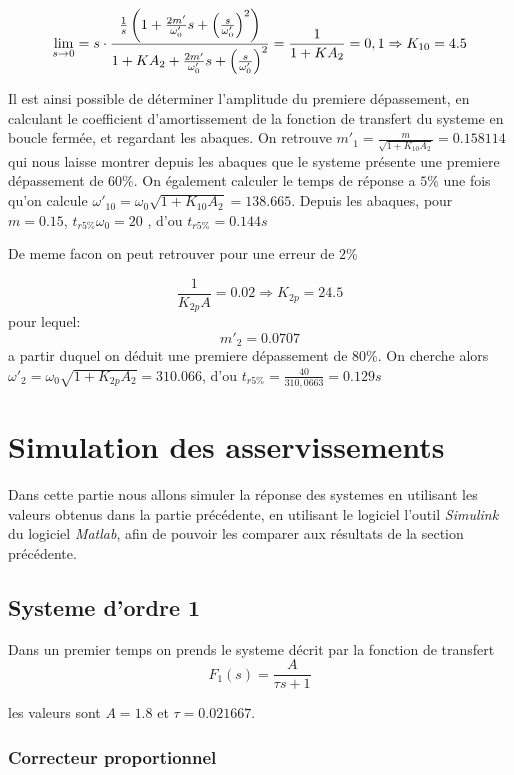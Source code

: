 \documentclass[12pt, a4paper]{report}
\begin{document}
$$
    \lim_{s \rightarrow 0} = s \cdot \frac{\frac{1}{s}\left(1 + \frac{2m'}{\omega_0'}s + \left( \frac{s}{\omega_0'}\right)^2\right)}{1 + KA_2 + \frac{2m'}{\omega_0'}s + \left( \frac{s}{\omega_0'}\right)^2} = \frac{1}{1 + KA_2} = 0,1 \Rightarrow K_{10} = 4.5 \\
$$

Il est ainsi possible de déterminer l'amplitude du premiere dépassement, en calculant le coefficient
d'amortissement de la fonction de transfert du systeme en boucle fermée, et regardant les abaques. On retrouve $m'_1 = \frac{m}{\sqrt{1+K_{10}A_2}} = 0.158114$ qui nous laisse montrer depuis les abaques que 
le systeme présente une premiere dépassement de $60\%$. On également calculer le temps de réponse a $5\%$ une fois qu'on calcule $\omega'_{10} = \omega_0 \sqrt{1 + K_{10}A_2} = 138.665$. Depuis les abaques, pour $m = 0.15$, $t_{r5\%}\omega_0 = 20$
, d'ou $t_{r5\%} = 0.144s$


De meme facon on peut retrouver pour une erreur de $2\%$

$$
\frac{1}{K_{2p}A} = 0.02 \Rightarrow K_{2p} = 24.5
$$
pour lequel:
$$
    m'_{2} = 0.0707
$$
a partir duquel on déduit une premiere dépassement de $80\%$. On cherche alors $\omega'_{2} = \omega_0 \sqrt{1 + K_{2p}A_2} = 310.066$, d'ou $t_{r5\%} = \frac{40}{310,0663} = 0.129s$


\section{Simulation des asservissements}

Dans cette partie nous allons simuler la réponse des systemes en utilisant les valeurs
obtenus dans la partie précédente, en utilisant le logiciel l'outil \textit{Simulink} du logiciel \textit{Matlab},
afin de pouvoir les comparer aux résultats de la section précédente.

\subsection{Systeme d'ordre 1}
Dans un premier temps on prends le systeme décrit par la fonction de transfert
$$
    F_{1}(s) = \frac{A}{\tau s + 1}
$$

les valeurs sont $A = 1.8$ et $\tau = 0.021667$.

\subsubsection{Correcteur proportionnel}
\end{document}
